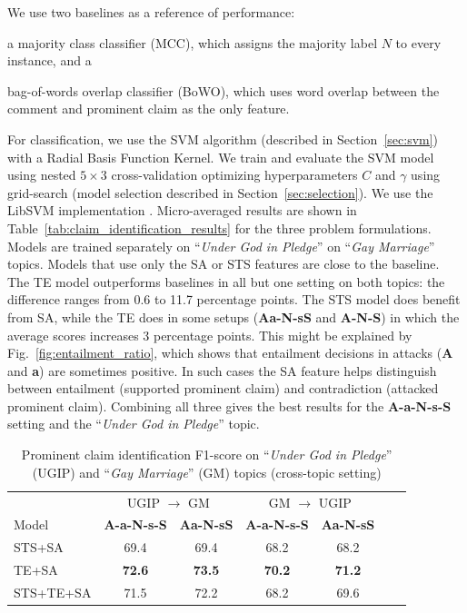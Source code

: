 We use two baselines as a reference of performance: 
\begin{enumerate*}[label=(\arabic*)]
\item a majority class classifier (MCC), which assigns the majority label $N$ to every instance, and a 
\item bag-of-words overlap classifier (BoWO), which uses word overlap between
	the comment and prominent claim as the only feature.
\end{enumerate*}
For classification, we use the SVM algorithm (described in Section~\ref{sec:svm}) with a 
Radial Basis Function Kernel. 
We train and evaluate the SVM model using nested $5 \times 3$ cross-validation
 optimizing hyperparameters $C$ and $\gamma$ using
grid-search (model selection described in Section~\ref{sec:selection}).
We use the LibSVM implementation \citep{chang2011libsvm}. 
Micro-averaged results are shown in Table~\ref{tab:claim_identification_results}
for the three problem formulations. 
Models are trained separately on ``\emph{Under God in Pledge}'' on ``\emph{Gay
Marriage}'' topics. 
Models that use only the SA or STS features are close to the baseline. 
The TE model outperforms baselines in all but one setting on both topics: 
the difference ranges from 0.6 to 11.7 percentage points. 
The STS model does benefit from SA, while the TE does in some setups 
(\textbf{Aa-N-sS} and \textbf{A-N-S}) in which the average scores increases 3 percentage points. 
This might be explained by Fig.~\ref{fig:entailment_ratio}, which shows that 
entailment decisions in attacks (\textbf{A} and \textbf{a}) are sometimes positive. 
In such cases the SA feature helps distinguish between entailment (supported prominent claim) 
and contradiction (attacked prominent claim). 
Combining all three gives the best results for the \textbf{A-a-N-s-S} setting
and the ``\emph{Under God in Pledge}'' topic.

\begin{table}
\centering
{\small
\begin{tabular}{@{}l ccc ccc@{}}
\toprule
& \multicolumn{2}{c}{UGIP $\to$ GM} & \multicolumn{2}{c}{GM $\to$ UGIP}\\
\cmidrule(lr){2-3}\cmidrule(lr){4-5}
Model & \textbf{A-a-N-s-S} & \textbf{Aa-N-sS}
      & \textbf{A-a-N-s-S} & \textbf{Aa-N-sS} \\
\midrule
STS+SA & 69.4 & 69.4 & 68.2 & 68.2   \\
TE+SA & \textbf{72.6 }& \textbf{73.5} & \textbf{70.2} & \textbf{71.2}  \\
STS+TE+SA  & 71.5 & 72.2 & 68.2 & 69.6  \\
\bottomrule
\end{tabular}}
	\caption{Prominent claim identification F1-score on ``\emph{Under God
	in Pledge}'' (UGIP) and ``\emph{Gay Marriage}'' (GM) topics (cross-topic
setting)}
\label{tab:claim_identification_crosstopic}
\end{table}


